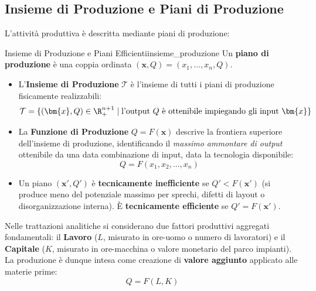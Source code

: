 \subsection{Insieme di Produzione e Piani di Produzione}
L'attività produttiva è descritta mediante piani di produzione:
\begin{definizione}{Insieme di Produzione e Piani Efficienti}{insieme_produzione}
Un \textbf{piano di produzione} è una coppia ordinata $(\bm{x}, Q) = (x_1, \dots, x_n, Q)$.
\begin{itemize}
    \item L'\textbf{Insieme di Produzione} $\mathcal{T}$ è l'insieme di tutti i piani di produzione fisicamente realizzabili:
    \begin{equation}
        \mathcal{T} = \{ (\bm{x}, Q) \in \R_+^{n+1} \mid \text{l'output } Q \text{ è ottenibile impiegando gli input } \bm{x} \}
    \end{equation}
    \item La \textbf{Funzione di Produzione} $Q = F(\bm{x})$ descrive la frontiera superiore dell'insieme di produzione, identificando il \textit{massimo ammontare di output} ottenibile da una data combinazione di input, data la tecnologia disponibile:
    \begin{equation}
        Q = F(x_1, x_2, \dots, x_n)
    \end{equation}
    \item Un piano $(\bm{x}', Q')$ è \textbf{tecnicamente inefficiente} se $Q' < F(\bm{x}')$ (si produce meno del potenziale massimo per sprechi, difetti di layout o disorganizzazione interna). È \textbf{tecnicamente efficiente} se $Q' = F(\bm{x}')$.
\end{itemize}
\end{definizione}

Nelle trattazioni analitiche si considerano due fattori produttivi aggregati fondamentali: il \textbf{Lavoro} ($L$, misurato in ore-uomo o numero di lavoratori) e il \textbf{Capitale} ($K$, misurato in ore-macchina o valore monetario del parco impianti). La produzione è dunque intesa come creazione di \textbf{valore aggiunto} applicato alle materie prime:
\begin{equation}
    Q = F(L, K)
\end{equation}

